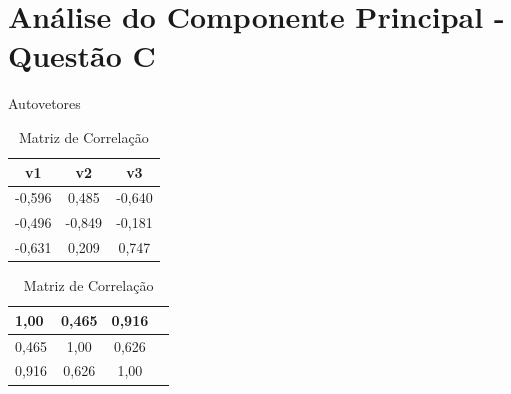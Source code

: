\documentclass[11pt,a4paper,openany,oneside]{abntex2}
\begin{document}
	
%




\chapter{Análise do Componente Principal - Questão C}


\begin{table}[H]
		\begin{minipage}[b]{0.45\linewidth}
			\centering
			\caption{Autovetores}
			\begin{tabular}{|c|c|c|}
				\toprule
				\textbf{v1} &  \textbf{v2} &  \textbf{v3}  \\ \hline
				-0,596 & 0,485 & -0,640 \\ \hline
				-0,496 & -0,849 & -0,181 \\ \hline
				-0,631 & 0,209  & 0,747 \\ 
				\bottomrule
			\end{tabular}
			\label{autovetores}	
		\end{minipage}
		\hspace{0.5cm}
		\begin{minipage}[b]{0.45\linewidth}
			\centering
			\caption{Matriz de Correlação} 
			\begin{tabular}{|l|c|c|c|}
				\toprule
				1,00 & 0,465 & 0,916\\ \hline
				0,465 & 1,00 & 0,626\\ \hline
				0,916 & 0,626	& 1,00\\ 
				
				\bottomrule
			\end{tabular}%
			\label{tab:correlacao}%
			
		\end{minipage}
\end{table}%
\end{document}
